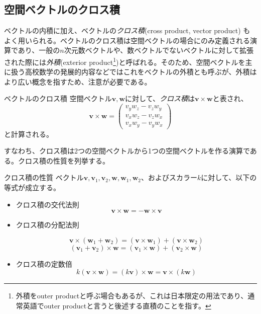 \subsection{空間ベクトルのクロス積}
ベクトルの内積に加え、ベクトルの\emph{クロス積}(cross product, vector product)
もよく用いられる。ベクトルのクロス積は空間ベクトルの場合にのみ定義される演算であり、一般の\(n\)次元数ベクトルや、数ベクトルでないベクトルに対して拡張された際には\emph{外積}(exterior product\footnote{外積をouter productと呼ぶ場合もあるが、これは日本限定の用法であり、通常英語でouter productと言うと後述する直積のことを指す。})と呼ばれる。そのため、空間ベクトルを主に扱う高校数学の発展的内容などではこれをベクトルの外積とも呼ぶが、外積はより広い概念を指すため、注意が必要である。
\begin{definition*}{ベクトルのクロス積}
	空間ベクトル\(\boldsymbol{v},\boldsymbol{w}\)に対して、\emph{クロス積}は\(\boldsymbol{v}\times\boldsymbol{w}\)と表され、
	\begin{equation}
		\boldsymbol{v}\times\boldsymbol{w}=
		\begin{pmatrix} v_y w_z - v_z w_y\\v_x w_z - v_z w_x \\ v_x w_y - v_y w_x \end{pmatrix}
	\end{equation}
	と計算される。
\end{definition*}
すなわち、クロス積は2つの空間ベクトルから1つの空間ベクトルを作る演算である。クロス積の性質を列挙する。
\begin{theorem*}{クロス積の性質}
	ベクトル\(\boldsymbol{v},\boldsymbol{v}_1,\boldsymbol{v}_2,\boldsymbol{w},\boldsymbol{w}_1,\boldsymbol{w}_2\)、およびスカラー\(k\)に対して、以下の等式が成立する。
	\begin{itemize}
		\item クロス積の交代法則
		      \begin{equation}
			      \boldsymbol{v}\times \boldsymbol{w}=-\boldsymbol{w}\times \boldsymbol{v}
		      \end{equation}
		\item クロス積の分配法則

		      \begin{equation}
			      \boldsymbol{v}\times(\boldsymbol{w}_1+\boldsymbol{w}_2)=  (\boldsymbol{v}\times \boldsymbol{w}_1) +  (\boldsymbol{v}\times \boldsymbol{w}_2)
		      \end{equation}
		      \begin{equation}
			      (\boldsymbol{v}_1+\boldsymbol{v}_2)\times\boldsymbol{w}= (\boldsymbol{v}_1\times \boldsymbol{w}) +  (\boldsymbol{v}_2\times \boldsymbol{w})
		      \end{equation}

		\item クロス積の定数倍
		      \begin{equation}
			      k(\boldsymbol{v}\times\boldsymbol{w})= (k\boldsymbol{v})\times\boldsymbol{w} = \boldsymbol{v}\times(k\boldsymbol{w})
		      \end{equation}
	\end{itemize}
\end{theorem*}
